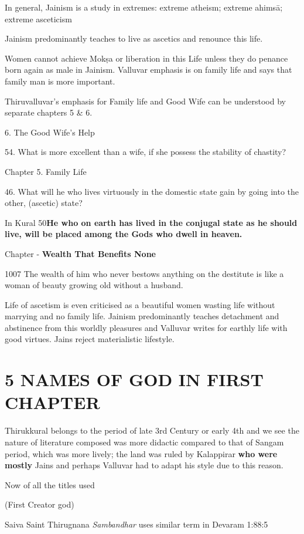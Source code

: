 In general, Jainism is a study in extremes: extreme atheism; extreme ahimsā; extreme asceticism

Jainism predominantly teaches to live as ascetics and renounce this life.

Women cannot achieve Mokṣa or liberation in this Life unless they do penance born again as male in Jainism. Valluvar emphasis is on family life and says that family man is more important. 

Thiruvalluvar’s emphasis for Family life and Good Wife can be understood by separate chapters 5 \& 6.

6. The Good Wife’s Help

54. \endnote{}What is more excellent than a wife, if she possess the stability of chastity?

Chapter 5. Family Life

46.\endnote{} What will he who lives virtuously in the domestic state gain by going into the other, (ascetic) state?

In Kural 50\endnote{}\textbf{He who on earth has lived in the conjugal state as he should live, will be placed among the Gods who dwell in heaven.}

Chapter - \textbf{Wealth That Benefits None}

1007\endnote{} The wealth of him who never bestows anything on the destitute is like a woman of beauty growing old without a husband.

Life of ascetism is even criticised as a beautiful women wasting life without marrying and no family life. Jainism predominantly teaches detachment and abstinence from this worldly pleasures and Valluvar writes for earthly life with good virtues. Jains reject materialistic lifestyle.


\section*{5 NAMES OF GOD IN FIRST CHAPTER}

Thirukkural belongs to the period of late 3rd Century or early 4th and we see the nature of literature composed was more didactic compared to that of Sangam period, which was more lively; the land was ruled by Kalappirar \textbf{who were mostly} Jains and perhaps Valluvar had to adapt his style due to this reason.

Now of all the titles used

 (First Creator god)

Saiva Saint Thirugnana \textit{Sambandhar} uses similar term in Devaram 1:88:5

